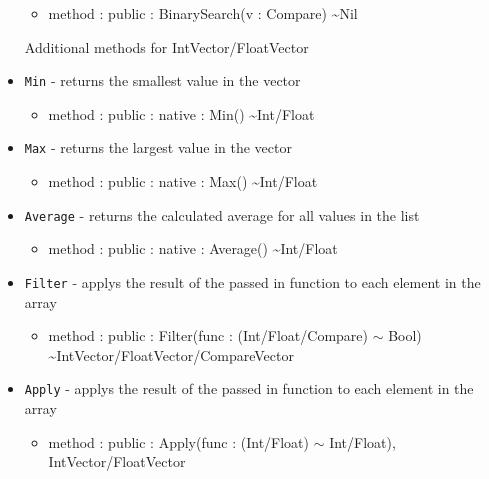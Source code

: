 \documentclass[11pt]{article}
\begin{document}
\begin{itemize}
\begin{itemize}
  \item method : public : BinarySearch(v : Compare) \textasciitilde Nil
  \end{itemize}
  Additional methods for IntVector/FloatVector
\item \texttt{Min} - returns the smallest value in the vector
  \begin{itemize}
  \item method : public : native : Min() \textasciitilde Int/Float
  \end{itemize}
\item \texttt{Max} - returns the largest value in the vector
  \begin{itemize}
  \item method : public : native : Max() \textasciitilde Int/Float
  \end{itemize}
\item \texttt{Average} - returns the calculated average for all values
  in the list
  \begin{itemize}
  \item method : public : native : Average() \textasciitilde Int/Float
  \end{itemize}
\item \texttt{Filter} - applys the result of the passed in function to
  each element in the array
  \begin{itemize}
  \item method : public : Filter(func : (Int/Float/Compare) $\sim$
    Bool) \textasciitilde IntVector/FloatVector/CompareVector
  \end{itemize}
\item \texttt{Apply} - applys the result of the passed in function to
  each element in the array
  \begin{itemize}
  \item method : public : Apply(func : (Int/Float) $\sim$ Int/Float),
    IntVector/FloatVector
  \end{itemize}
\end{itemize}
\end{document}
